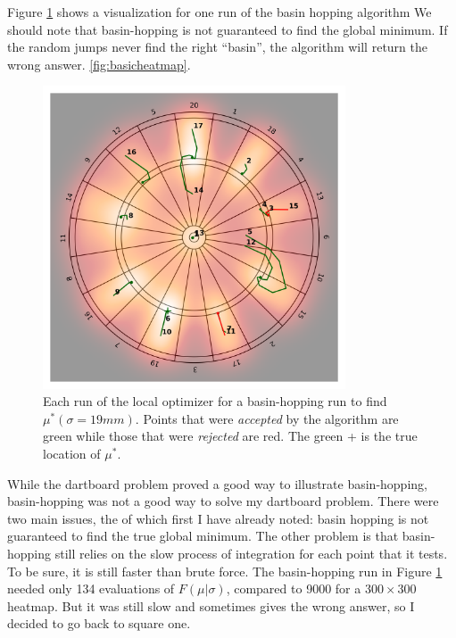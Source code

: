 \documentclass[]{article}
\newcommand{\mustar}{\ensuremath{\mu^* }}
\begin{document}
Figure \ref{fig:basin} shows a visualization for one run of the basin hopping algorithm
We should note that basin-hopping is not guaranteed to find the global minimum. If the random jumps never find the right ``basin'', the algorithm will return the wrong answer.
 \ref{fig:basicheatmap}.
\begin{figure}[h!]
	\centering
	\includegraphics[width=0.8\textwidth]{../images/sig19basin.png}
	\caption{Each run of the local optimizer for a basin-hopping run to find $\mustar(\sigma=19mm)$.  Points that were \textit{accepted} by the algorithm are green while those that were \textit{rejected} are red. The green + is the true location of \mustar.}
	\label{fig:basin}
\end{figure}

While the dartboard problem proved a good way to illustrate basin-hopping, basin-hopping was not a good way to solve my dartboard problem. There were two main issues, the of which first I have already noted: basin hopping is not guaranteed to find the true global minimum. The other problem is that basin-hopping still relies on the slow process of integration for each point that it tests. To be sure, it is still faster than brute force. The basin-hopping run in Figure \ref{fig:basin} needed only 134 evaluations of $F(\mu \vert \sigma)$, compared to 9000 for a $300 \times 300$ heatmap. But it was still slow and sometimes gives the wrong answer, so I decided to go back to square one.
\end{document}
